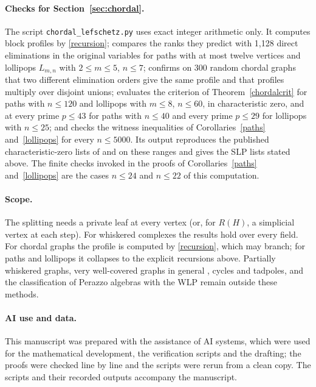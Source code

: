 \documentclass[11pt,a4paper]{article}
\theoremstyle{definition}
\begin{document}
\paragraph{Checks for Section~\ref{sec:chordal}.}
The script \texttt{chordal\_lefschetz.py} uses exact integer arithmetic only. It computes block profiles by \eqref{recursion}; compares the ranks they predict with 1{,}128 direct eliminations in the original variables for paths with at most twelve vertices and lollipops $L_{m,n}$ with $2\le m\le5$, $n\le7$; confirms on 300 random chordal graphs that two different elimination orders give the same profile and that profiles multiply over disjoint unions; evaluates the criterion of Theorem~\ref{chordalcrit} for paths with $n\le120$ and lollipops with $m\le8$, $n\le60$, in characteristic zero, and at every prime $p\le43$ for paths with $n\le40$ and every prime $p\le29$ for lollipops with $n\le25$; and checks the witness inequalities of Corollaries~\ref{paths} and~\ref{lollipops} for every $n\le5000$. Its output reproduces the published characteristic-zero lists of \cite{NT} and \cite{TPS} on these ranges and gives the SLP lists stated above. The finite checks invoked in the proofs of Corollaries~\ref{paths} and~\ref{lollipops} are the cases $n\le24$ and $n\le22$ of this computation.

\paragraph{Scope.}
The splitting needs a private leaf at every vertex (or, for $R(H)$, a simplicial vertex at each step). For whiskered complexes the results hold over every field. For chordal graphs the profile is computed by \eqref{recursion}, which may branch; for paths and lollipops it collapses to the explicit recursions above. Partially whiskered graphs, very well-covered graphs in general \cite[Example~3.18]{HN}, cycles and tadpoles, and the classification of Perazzo algebras with the WLP remain outside these methods.

\paragraph{AI use and data.}
This manuscript was prepared with the assistance of AI systems, which were used for the mathematical development, the verification scripts and the drafting; the proofs were checked line by line and the scripts were rerun from a clean copy. The scripts and their recorded outputs accompany the manuscript.
\end{document}
